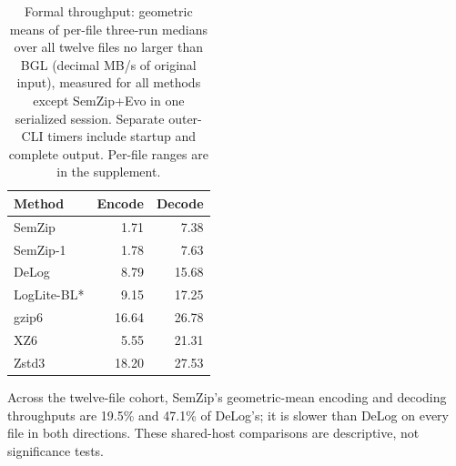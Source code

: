 \begin{table}[t]\centering\small
\caption{Formal throughput: geometric means of per-file three-run medians over all twelve files no larger than BGL (decimal MB/s of original input), measured for all methods except SemZip+Evo in one serialized session. Separate outer-CLI timers include startup and complete output. Per-file ranges are in the supplement.}
\label{tab:external-speed}
\begin{tabular}{lrr}
\toprule
Method & Encode & Decode \\
\midrule
SemZip & 1.71 & 7.38 \\
SemZip-1 & 1.78 & 7.63 \\
DeLog & 8.79 & 15.68 \\
LogLite-BL* & 9.15 & 17.25 \\
gzip6 & 16.64 & 26.78 \\
XZ6 & 5.55 & 21.31 \\
Zstd3 & 18.20 & 27.53 \\
\bottomrule
\end{tabular}\end{table}
Across the twelve-file cohort, SemZip's geometric-mean encoding and decoding throughputs are 19.5\% and 47.1\% of DeLog's; it is slower than DeLog on every file in both directions. These shared-host comparisons are descriptive, not significance tests.
